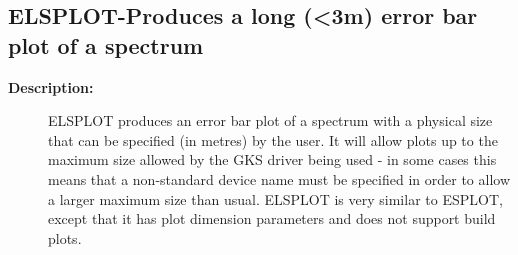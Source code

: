 \subsection{ELSPLOT-\label{ELSPLOT}Produces a long (<3m) error bar plot of a spectrum}
\begin{description}

\item [{\bf Description:}]
 ELSPLOT produces an error bar plot of a spectrum with a physical
 size that can be specified (in metres) by the user. It will
 allow plots up to the maximum size allowed by the GKS driver
 being used - in some cases this means that a non-standard device
 name must be specified in order to allow a larger maximum size
 than usual.  ELSPLOT is very similar to ESPLOT, except that it
 has plot dimension parameters and does not support build plots.


\end{description}
